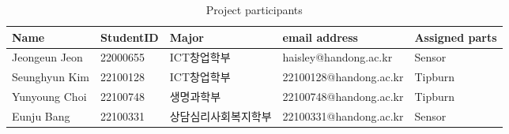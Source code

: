 \begin{longtable}[c]{@{}lllll@{}}
    \caption{Project participants}
    \label{tab:my-table}\\
    \toprule
    Name & StudentID & Major & email address & Assigned parts \\* \midrule
    \endfirsthead
    \endhead
    \bottomrule
    \endfoot
    \endlastfoot
    Jeongeun Jeon  & 22000655 & ICT창업학부 & haisley@handong.ac.kr & Sensor \\
    Seunghyun Kim & 22100128 & ICT창업학부 & 22100128@handong.ac.kr & Tipburn \\
    Yunyoung Choi & 22100748 & 생명과학부 & 22100748@handong.ac.kr & Tipburn \\
    Eunju Bang & 22100331 & 상담심리사회복지학부 & 22100331@handong.ac.kr & Sensor \\* \bottomrule
\end{longtable}
